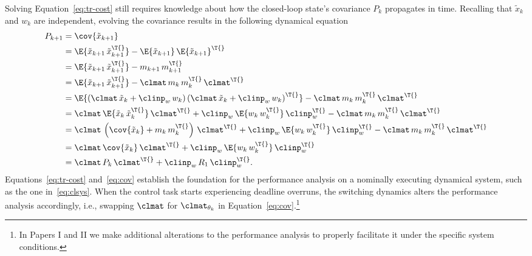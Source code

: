 Solving Equation~\eqref{eq:tr-cost} still requires knowledge about how the closed-loop state's covariance $P_k$ propagates in time.
Recalling that $\tilde{x}_k$ and $w_k$ are independent, evolving the covariance results in the following dynamical equation
%
\begin{equation}%
    \label{eq:cov}%
    \begin{aligned}
        P_{k+1} &= \cov{\tilde{x}_{k+1}} \\
        &= \E{\tilde{x}_{k+1}\,\tilde{x}_{k+1}^\T{}} - \E{\tilde{x}_{k+1}}\,\E{\tilde{x}_{k+1}}^\T{} \\
        &= \E{\tilde{x}_{k+1}\,\tilde{x}_{k+1}^\T{}} - m_{k+1}\,m_{k+1}^\T{} \\
        &= \E{\tilde{x}_{k+1}\,\tilde{x}_{k+1}^\T{}} - \clmat\, m_{k}\,m_{k}^\T{}\,\clmat^\T{} \\
        &= \E{ \left( \clmat\,\tilde{x}_k + \clinp_w\, w_k \right)\left( \clmat\,\tilde{x}_k + \clinp_w\, w_k \right)^\T{} } - \clmat\, m_{k}\,m_{k}^\T{}\,\clmat^\T{} \\
        &= \clmat\,\E{ \tilde{x}_k\,\tilde{x}_k^\T{} }\,\clmat^\T{} + \clinp_w\,\E{ w_k\,w_k^\T{} }\,\clinp_w^\T{} - \clmat\, m_{k}\,m_{k}^\T{}\,\clmat^\T{} \\
        &= \clmat\,\left( \cov{\tilde{x}_k} + m_k\,m_k^\T{} \right)\,\clmat^\T{} + \clinp_w\,\E{ w_k\,w_k^\T{} }\,\clinp_w^\T{} - \clmat\, m_k\,m_{k}^\T{}\,\clmat^\T{} \\
        &= \clmat\,\cov{\tilde{x}_k}\,\clmat^\T{} + \clinp_w\,\E{ w_k\,w_k^\T{} }\,\clinp_w^\T{} \\
        &= \clmat\,P_k\,\clmat^\T{} + \clinp_w\,R_1\,\clinp_w^\T{}.
    \end{aligned}
\end{equation}
%
Equations~\eqref{eq:tr-cost} and~\eqref{eq:cov} establish the foundation for the performance analysis on a nominally executing dynamical system, such as the one in~\eqref{eq:clsys}.
When the control task starts experiencing deadline overruns, the switching dynamics alters the performance analysis accordingly, i.e., swapping $\clmat$ for $\clmat_{\theta_k}$ in Equation~\eqref{eq:cov}.\footnote{In Papers I and II we make additional alterations to the performance analysis to properly facilitate it under the specific system conditions.}

